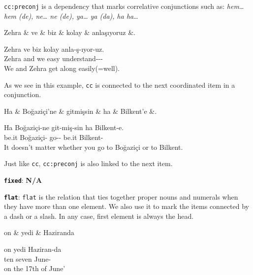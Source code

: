 \documentclass[11pt,a4paper]{article}
\begin{document}
\texttt{cc:preconj} is a dependency that marks correlative conjunctions such as: \textit{hem… hem (de), ne… ne (de), ya… ya (da), ha ha}…

\begin{exe}
\ex \label{cc}
\begin{dependency}
\begin{deptext}[column sep=0.24cm]
Zehra \& ve \& biz \& kolay \& anlaşıyoruz \&. \\
\end{deptext}
\end{dependency}
\gll Zehra ve biz kolay anla-ş-ıyor-uz. \\
Zehra and we easy understand-\Refl{}-\Prog{}-\Fpl{}\\
\glt We and Zehra get along easily(=well).
\end{exe}

As we see in this example, \texttt{cc} is connected to the next coordinated item in a conjunction.

\begin{exe}
\ex \label{cc:preconj}
\begin{dependency}
\begin{deptext}[column sep=0.24cm]
Ha \& Boğaziçi'ne \& gitmişsin \& ha \& Bilkent'e \&. \\
\end{deptext}
\end{dependency}
\gll Ha Boğaziçi-ne git-miş-sin ha Bilkent-e. \\
be.it Boğaziçi-\Loc{} go-\Pst{}-\Ssg{} be.it Bilkent-\Loc{}\\
\glt It doesn’t matter whether you go to Boğaziçi or to Bilkent.
\end{exe}

Just like \texttt{cc}, \texttt{cc:preconj} is also linked to the next item.

\textbf{\texttt{fixed}}:
\textbf{N/A}

\textbf{\texttt{flat}}:
\texttt{flat} is the relation that ties together proper nouns and numerals when they have more than one element. We also use it to mark the items connected by a dash or a slash. In any case, first element is always the head.

\begin{exe}
\ex \label{flat}
\begin{dependency}
\begin{deptext}
on \& yedi \& Haziranda \\
\end{deptext}
\end{dependency}
\gll on yedi Haziran-da \\
ten seven June-\Loc{} \\
\glt on the 17th of June’
\end{exe}
\end{document}
